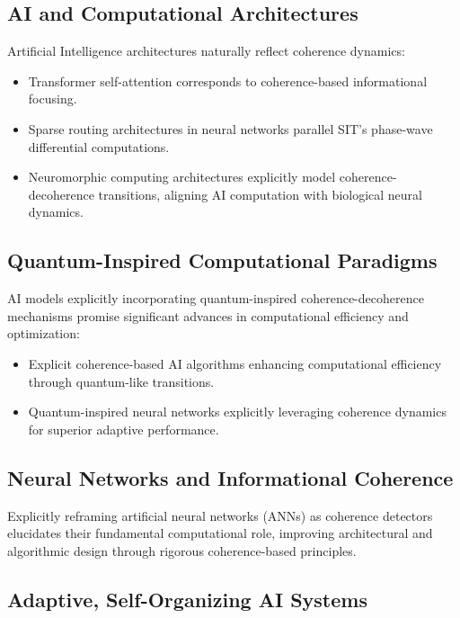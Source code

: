 \subsection{AI and Computational Architectures}

Artificial Intelligence architectures naturally reflect coherence dynamics:
\begin{itemize}
\item Transformer self-attention corresponds to coherence-based informational focusing.
\item Sparse routing architectures in neural networks parallel SIT's phase-wave differential computations.
\item Neuromorphic computing architectures explicitly model coherence-decoherence transitions, aligning AI computation with biological neural dynamics.
\end{itemize}

\subsection{Quantum-Inspired Computational Paradigms}

AI models explicitly incorporating quantum-inspired coherence-decoherence mechanisms promise significant advances in computational efficiency and optimization:

\begin{itemize}
\item Explicit coherence-based AI algorithms enhancing computational efficiency through quantum-like transitions.
\item Quantum-inspired neural networks explicitly leveraging coherence dynamics for superior adaptive performance.
\end{itemize}

\subsection{Neural Networks and Informational Coherence}

Explicitly reframing artificial neural networks (ANNs) as coherence detectors elucidates their fundamental computational role, improving architectural and algorithmic design through rigorous coherence-based principles.

\subsection{Adaptive, Self-Organizing AI Systems}

